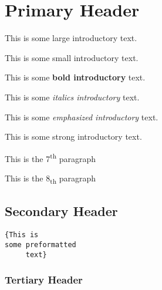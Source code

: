 \documentclass[12pt]{article}
\begin{document}
\section{Primary Header}

\begin{paragraph}
This is some {\Large large introductory} text.
\end{paragraph}

\begin{paragraph}
This is some {\scriptsize small introductory} text.
\end{paragraph}

\begin{paragraph}
This is some \textbf{bold introductory} text.
\end{paragraph}

\begin{paragraph}
This is some \textit{italics introductory} text.
\end{paragraph}

\begin{paragraph}
This is some \emph{emphasized introductory} text.
\end{paragraph}

\begin{paragraph}
This is some \textmd{strong introductory} text.
\end{paragraph}

\begin{paragraph}
This is the 7\textsuperscript{th} paragraph
\end{paragraph}

\begin{paragraph}
This is the 8\textsubscript{th} paragraph
\end{paragraph}
\subsection{Secondary Header}

\begin{verbatim}
{This is
some preformatted
     text}
\end{verbatim}
\subsubsection{Tertiary Header}
\end{document}
